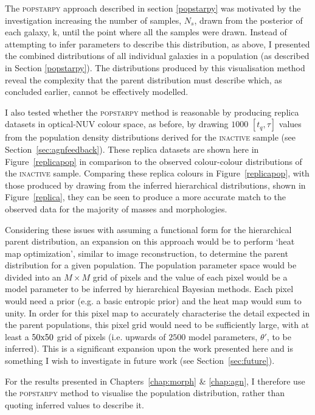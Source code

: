 The \textsc{popstarpy} approach described in section \ref{popstarpy} was motivated by the investigation increasing the number of samples, $N_s$, drawn from the posterior of each galaxy, k, until the point where all the samples were drawn. Instead of attempting to infer parameters to describe this distribution, as above, I presented the combined distributions of all individual galaxies in a population (as described in Section \ref{popstarpy}).  The distributions produced by this visualisation method reveal the complexity that the parent distribution must describe which, as concluded earlier, cannot be effectively modelled.

I also tested whether the \textsc{popstarpy} method is reasonable by producing replica datasets in optical-NUV colour space, as before, by drawing $1000$ $[t_q, \tau]$ values from the population density distributions derived for the \textsc{inactive} sample (see Section~\ref{sec:agnfeedback}). These replica datasets are shown here in Figure~\ref{replicapop} in comparison to the observed colour-colour distributions of the \textsc{inactive} sample. Comparing these replica colours in Figure~\ref{replicapop}, with those produced by drawing from the inferred hierarchical distributions, shown in Figure~\ref{replica}, they can be seen to produce a more accurate match to the observed data for the majority of masses and morphologies. 

Considering these issues with assuming a functional form for the hierarchical parent distribution, an expansion on this approach would be to perform `heat map optimization', similar to image reconstruction, to determine the parent distribution for a given population. The population parameter space would be divided into an $M \times M$ grid of pixels and the value of each pixel would be a model parameter to be inferred by hierarchical Bayesian methods. Each pixel would need a prior (e.g. a basic entropic prior) and the heat map would sum to unity. In order for this pixel map to accurately characterise the detail expected in the parent populations, this pixel grid would need to be sufficiently large, with at least a $50\rm{x}50$ grid of pixels (i.e. upwards of $2500$ model parameters, $\theta'$, to be inferred). This is a significant expansion upon the work presented here and is something I wish to investigate in future work (see Section~\ref{sec:future}).

For the results presented in Chapters~\ref{chap:morph} \& \ref{chap:agn}, I therefore use the \textsc{popstarpy} method to visualise the population distribution, rather than quoting inferred values to describe it.


